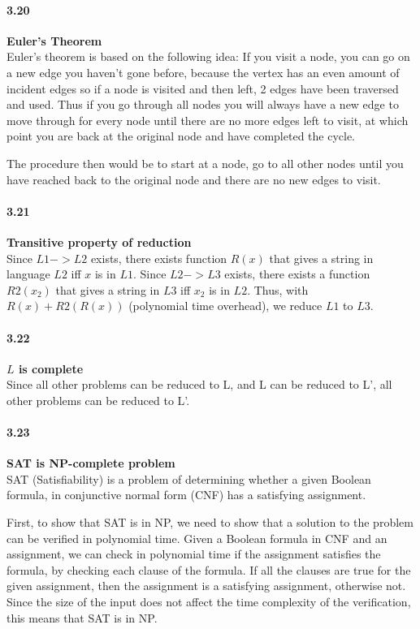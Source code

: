 \paragraph{3.20} \textbf{Euler's Theorem}
\\

Euler’s theorem is based on the following idea: If you visit a node, you can go on a new edge you haven’t gone before, because the vertex has an even amount of incident edges so if a node is visited and then left, 2 edges have been traversed and used. Thus if you go through all nodes you will always have a new edge to move through for every node until there are no more edges left to visit, at which point you are back at the original node and have completed the cycle. 

The procedure then would be to start at a node, go to all other nodes until you have reached back to the original node and there are no new edges to visit.

\paragraph{3.21}\textbf{Transitive property of reduction}
\\
Since $L1 -> L2$ exists, there exists function $R(x)$ that gives a string in language $L2$ iff $x$ is in $L1$. Since $L2 -> L3$ exists, there exists a function $R2(x_2)$ that gives a string in $L3$ iff $x_2$ is in $L2$. Thus, with $R(x) + R2(R(x))$ (polynomial time overhead), we reduce $L1$ to $L3$.

\paragraph{3.22} \textbf{$L$ is complete}
\\
Since all other problems can be reduced to L, and L can be reduced to L’, all other problems can be reduced to L’. 




\paragraph{3.23} \textbf{SAT is NP-complete problem}
\\

SAT (Satisfiability) is a problem of determining whether a given Boolean formula, in conjunctive normal form (CNF) has a satisfying assignment.

First, to show that SAT is in NP, we need to show that a solution to the problem can be verified in polynomial time. Given a Boolean formula in CNF and an assignment, we can check in polynomial time if the assignment satisfies the formula, by checking each clause of the formula. If all the clauses are true for the given assignment, then the assignment is a satisfying assignment, otherwise not. Since the size of the input does not affect the time complexity of the verification, this means that SAT is in NP.

